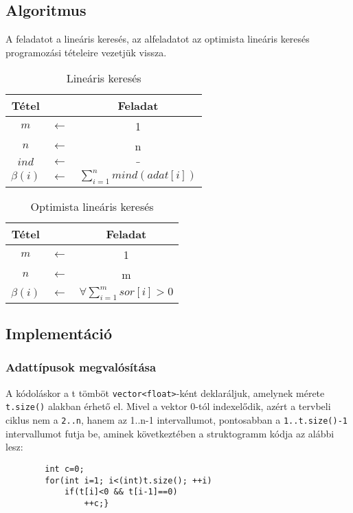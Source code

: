 \documentclass[a4paper]{article}
\begin{document}
    \subsection{Algoritmus}
      A feladatot a lineáris keresés, az alfeladatot az optimista lineáris keresés programozási tételeire vezetjük vissza.
      \begin{table}[H]
        \caption*{Lineáris keresés}
        \begin{tabular*}{0.55\textwidth}{ccc}
          \toprule
          Tétel & & Feladat \\
          \midrule
          $m$ & $\leftarrow$ & 1 \\
          $n$ & $\leftarrow$ & n \\
          $ind$ & $\leftarrow$ & $\_$ \\
          $\beta (i)$ & $\leftarrow$ & $\sum_{i=1}^n mind(adat[i])$ \\
          \bottomrule
        \end{tabular*}
      \end{table}
      \begin{table}[H]
        \caption*{Optimista lineáris keresés}
        \begin{tabular*}{0.55\textwidth}{ccc}
          \toprule
          Tétel & & Feladat \\
          \midrule
          $m$ & $\leftarrow$ & 1 \\
          $n$ & $\leftarrow$ & m \\
          $\beta (i)$ & $\leftarrow$ & $\forall \sum_{i=1}^m sor[i]>0$ \\
          \bottomrule
        \end{tabular*}
      \end{table}
      
    \subsection{Implementáció}
        \subsubsection{Adattípusok megvalósítása}
        A kódoláskor a t tömböt \texttt{vector<float>}-ként deklaráljuk, amelynek mérete \texttt{t.size()} alakban érhető el. Mivel a vektor 0-tól indexelődik, azért a tervbeli ciklus nem a \texttt{2..n}, hanem az 1..n-1 intervallumot, pontosabban a \texttt{1..t.size()-1} intervallumot futja be, aminek következtében a struktogramm kódja az alábbi lesz:
        \begin{lstlisting}
        int c=0;
        for(int i=1; i<(int)t.size(); ++i)
            if(t[i]<0 && t[i-1]==0)
                ++c;}
        \end{lstlisting}
\end{document}
